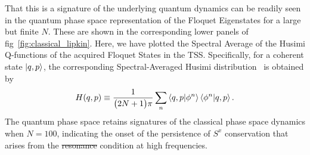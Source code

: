 \documentclass[%
reprint,
superscriptaddress,
amsmath,amssymb,
aps,
prb,
showkeys,
]{revtex4-2}
\providecommand{\DIFaddtex}[1]{{\protect\color{blue}\uwave{#1}}} %
\providecommand{\DIFdeltex}[1]{{\protect\color{red}\sout{#1}}}                      %
\providecommand{\DIFaddbegin}{} %
\providecommand{\DIFaddend}{} %
\providecommand{\DIFdelbegin}{} %
\providecommand{\DIFdelend}{} %
\providecommand{\DIFadd}[1]{\texorpdfstring{\DIFaddtex{#1}}{#1}} %
\providecommand{\DIFdel}[1]{\texorpdfstring{\DIFdeltex{#1}}{}} %
\newcommand{\DIFscaledelfig}{0.5}
\newlength{\DIFdelgraphicswidth} %
\newlength{\DIFdelgraphicsheight} %
\newcommand{\DIFaddincludegraphics}[2][]{{\color{blue}\fbox{\DIFOincludegraphics[#1]{#2}}}} %
\newcommand{\DIFdelincludegraphics}[2][]{%
\sbox{\DIFdelgraphicsbox}{\DIFOincludegraphics[#1]{#2}}%
\settoboxwidth{\DIFdelgraphicswidth}{\DIFdelgraphicsbox} %
\settoboxtotalheight{\DIFdelgraphicsheight}{\DIFdelgraphicsbox} %
\scalebox{\DIFscaledelfig}{%
\parbox[b]{\DIFdelgraphicswidth}{\usebox{\DIFdelgraphicsbox}\\[-\baselineskip] \rule{\DIFdelgraphicswidth}{0em}}\llap{\resizebox{\DIFdelgraphicswidth}{\DIFdelgraphicsheight}{%
\setlength{\unitlength}{\DIFdelgraphicswidth}%
\begin{picture}(1,1)%
\thicklines\linethickness{2pt} %
{\color[rgb]{1,0,0}\put(0,0){\framebox(1,1){}}}%
{\color[rgb]{1,0,0}\put(0,0){\line( 1,1){1}}}%
{\color[rgb]{1,0,0}\put(0,1){\line(1,-1){1}}}%
\end{picture}%
}\hspace*{3pt}}} %
} %
\DeclareRobustCommand{\DIFaddbegin}{\DIFOaddbegin \let\includegraphics\DIFaddincludegraphics} %
\DeclareRobustCommand{\DIFaddend}{\DIFOaddend \let\includegraphics\DIFOincludegraphics} %
\DeclareRobustCommand{\DIFdelbegin}{\DIFOdelbegin \let\includegraphics\DIFdelincludegraphics} %
\DeclareRobustCommand{\DIFdelend}{\DIFOaddend \let\includegraphics\DIFOincludegraphics} %
\begin{document}
That this is a signature of the underlying quantum dynamics can be readily seen in the quantum phase space representation of the Floquet Eigenstates for a large but finite $N$. These are shown in the corresponding lower panels of fig\DIFaddbegin \DIFadd{.}\DIFaddend ~\ref{fig:classical_lipkin}. Here, we have plotted the Spectral Average of the Husimi Q-functions of the acquired Floquet States in the TSS. Specifically, for a coherent state $\ket{q,p}$, the corresponding Spectral-Averaged Husimi distribution~\cite{husimi} is obtained by 
\begin{equation}
	H(q,p)\equiv \frac{1}{\big(2N+1\big)\pi}\sum_n \ip{q,p}{\phi^n}\ip{\phi^n}{q,p}.
	\label{eq:husimi}
\end{equation}
The quantum phase space retains signatures of the classical phase space dynamics when $N=100$, indicating the onset of the persistence of $S^x$ conservation that arises from the \DIFdelbegin \DIFdel{resonance }\DIFdelend \DIFaddbegin \DIFadd{freezing }\DIFaddend condition at high frequencies. 
\DIFdelbegin %
\end{document}
